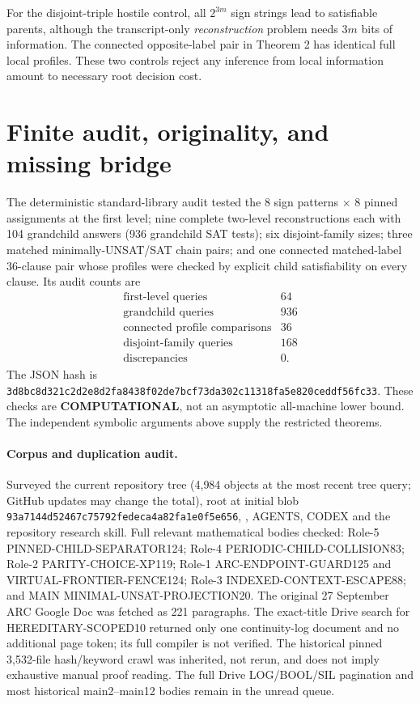 \documentclass[11pt]{article}
\begin{document}
For the disjoint-triple hostile control, all $2^{3m}$ sign strings
lead to satisfiable parents, although the transcript-only
\emph{reconstruction} problem needs $3m$ bits of information.
The connected opposite-label pair in Theorem 2 has identical
full local profiles. These two controls reject any inference from
local information amount to necessary root decision cost.

\section{Finite audit, originality, and missing bridge}
The deterministic standard-library audit tested the 8 sign
patterns $\times$ 8 pinned assignments at the first level;
nine complete two-level reconstructions each with 104
grandchild answers (936 grandchild SAT tests); six disjoint-family
sizes; three matched minimally-UNSAT/SAT chain pairs; and one
connected matched-label 36-clause pair whose profiles were
checked by explicit child satisfiability on every clause.
Its audit counts are
\[
\begin{array}{lr}
\text{first-level queries}&64\\
\text{grandchild queries}&936\\
\text{connected profile comparisons}&36\\
\text{disjoint-family queries}&168\\
\text{discrepancies}&0.
\end{array}
\]
The JSON hash is
\texttt{3d8bc8d321c2d2e8d2fa8438f02de7bcf73da302c11318fa5e820ceddf56fc33}.
These checks are \textbf{COMPUTATIONAL}, not an asymptotic
all-machine lower bound. The independent symbolic arguments above
supply the restricted theorems.

\paragraph{Corpus and duplication audit.}
Surveyed the current repository tree (4,984 objects at the most
recent tree query; GitHub updates may change the total), root
 at initial blob
\texttt{93a7144d52467c75792fedeca4a82fa1e0f5e656},
, AGENTS, CODEX and the repository research skill.
Full relevant mathematical bodies checked: Role-5
PINNED-CHILD-SEPARATOR124; Role-4 PERIODIC-CHILD-COLLISION83;
Role-2 PARITY-CHOICE-XP119; Role-1 ARC-ENDPOINT-GUARD125 and
VIRTUAL-FRONTIER-FENCE124; Role-3 INDEXED-CONTEXT-ESCAPE88;
and MAIN MINIMAL-UNSAT-PROJECTION20. The original 27 September
ARC Google Doc was fetched as 221 paragraphs. The exact-title
Drive search for HEREDITARY-SCOPED10 returned only one
continuity-log document and no additional page token; its
full compiler is not verified. The historical pinned 3,532-file
hash/keyword crawl was inherited, not rerun, and does not imply
exhaustive manual proof reading. The full Drive LOG/BOOL/SIL
pagination and most historical main2--main12 bodies remain
in the unread queue.
\end{document}
